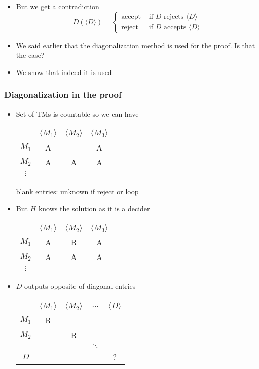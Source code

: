 \begin{frame}[allowframebreaks]
\begin{itemize}
\item But we get a contradiction
  \begin{equation*}
    D(\langle  D\rangle )
=
\begin{cases}
  \mbox{accept } & 
\mbox{if } D \mbox{ rejects } \langle  D\rangle \\
\mbox{reject} & \mbox{if } D \mbox{ accepts } \langle  D\rangle 
\end{cases}
  \end{equation*}
\item We said earlier that the diagonalization method
  is used for the proof. Is that the case?
\item We show that indeed it is used
  
\end{itemize}\end{frame} \begin{frame}[allowframebreaks] \frametitle{Diagonalization in the proof}
  \begin{itemize}
\item Set of TMs is countable so we can have
  \begin{center}
    \begin{tabular}{c|ccc}
& $\langle  M_1\rangle $ & $\langle  M_2\rangle $ & $\langle  M_3\rangle $\\ \hline
$M_1$ & A & &A\\
$M_2$ & A & A &A\\
$\vdots$ &&&
    \end{tabular}
  \end{center}
blank entries: unknown if reject or loop

\item But $H$ knows the solution as it is a decider
  
  \begin{center}
    \begin{tabular}{c|ccc}
& $\langle  M_1\rangle $ & $\langle  M_2\rangle $ & $\langle  M_3\rangle $\\ \hline
$M_1$ & A & R & A\\
$M_2$ & A & A & A\\
$\vdots$ &&&
    \end{tabular}
  \end{center}

\item $D$ outputs \alert{opposite of diagonal entries}
  \begin{center}
    \begin{tabular}{c|cccc}
& $\langle  M_1\rangle $ & $\langle  M_2\rangle $ & $\ldots$ & $\langle  D\rangle $\\ \hline
$M_1$ & R & &&\\
$M_2$ &  & R && \\
&& & $\ddots$ & \\
$D$ &&&& ?
    \end{tabular}
  \end{center}


\end{itemize}
\end{frame}
